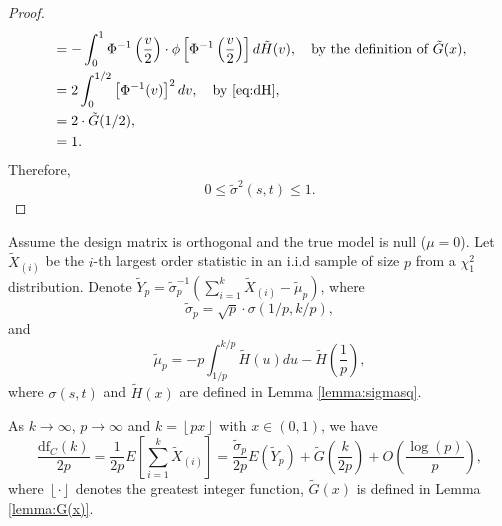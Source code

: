 \begin{proof}
\begin{equation*}
\begin{aligned}
	&= -\int_{0}^{1} \Phi^{-1}\left(\frac{v}{2}\right)\cdot \phi\left[\Phi^{-1}\left(\frac{v}{2}\right)\right]d\tilde{H}(v),\quad \text{by the definition of $\tilde{G}(x)$},\\
	&= 2\int_{0}^{1/2} \left[\Phi^{-1}(v)\right]^2 dv, \quad \text{by \eqref{eq:dH}},\\
	&=2\cdot \tilde{G}(1/2),\\
	&=1.
	\end{aligned}
	\end{equation*}
	Therefore,
	\begin{equation*}
	0 \le \tilde{\sigma}^2(s,t) \le 1.
	\end{equation*}
\end{proof}




\begin{theorem}
	\label{thm:ydf_representation}
	Assume the design matrix is orthogonal and the true model is null ($\mu=0$). Let $\tilde{X}_{(i)}$ be the $i$-th largest order statistic in an i.i.d sample of size $p$ from a $\chi^2_1$ distribution. Denote $\tilde{Y}_p = \tilde{\sigma}_p^{-1}(\sum_{i=1}^k \tilde{X}_{(i)} - \tilde{\mu}_p)$, where
	\begin{equation*}
	\tilde{\sigma}_p = \sqrt{p} \cdot \sigma(1/p,k/p),
	\end{equation*}
	and
	\begin{equation*}
	\tilde{\mu}_p = -p \int_{1/p}^{k/p} \tilde{H}(u) du - \tilde{H}\left(\frac{1}{p}\right),
	\end{equation*}
	where $\sigma(s,t)$ and $\tilde{H}(x)$ are defined in Lemma \ref{lemma:sigmasq}.
	
	As $k \to \infty$, $p \to \infty$ and $k=\left \lfloor{px}\right \rfloor$ with $x \in (0,1)$, we have
	\begin{equation}
	\frac{\text{df}_C(k)}{2p} = \frac{1}{2p} E\left[ \sum_{i=1}^k \tilde{X}_{(i)} \right]=  \frac{\tilde{\sigma}_p}{2p}E(\tilde{Y}_p) + \tilde{G}\left(\frac{k}{2p}\right) + O\left(\frac{\log(p)}{p}\right),
	\label{eq:ydf/2p_representation}
	\end{equation}
	where $\left \lfloor{\cdot}\right \rfloor$ denotes the greatest integer function, $\tilde{G}(x)$ is defined in Lemma \ref{lemma:G(x)}.
	
\end{theorem}

